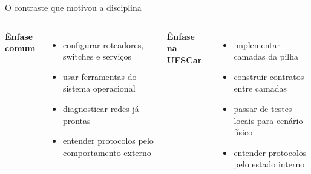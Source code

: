 \documentclass[aspectratio=169,11pt]{beamer}
\newcommand{\eyebrow}[1]{{\color{caipyraOrange}\small\bfseries #1}\par\vspace{0.25em}}
\newenvironment{tightitemize}{%
  \begin{itemize}\setlength{\itemsep}{0.25em}\setlength{\parskip}{0pt}
}{\end{itemize}}
\begin{document}
\begin{frame}{O contraste que motivou a disciplina}
  \begin{columns}[T,onlytextwidth]
    \eyebrow{Ênfase comum}
    \begin{tightitemize}
      \item configurar roteadores, switches e serviços
      \item usar ferramentas do sistema operacional
      \item diagnosticar redes já prontas
      \item entender protocolos pelo comportamento externo
    \end{tightitemize}

    \eyebrow{Ênfase na UFSCar}
    \begin{tightitemize}
      \item implementar camadas da pilha
      \item construir contratos entre camadas
      \item passar de testes locais para cenário físico
      \item entender protocolos pelo estado interno
    \end{tightitemize}
  \end{columns}
\end{frame}
\end{document}
